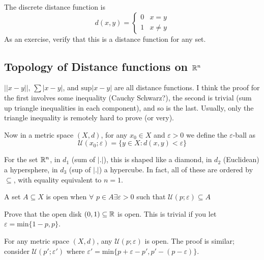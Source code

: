 \documentclass[12pt]{article}
\begin{document}
\begin{ex}
    The discrete distance function is
    \begin{equation}
        d(x,y) = \begin{cases} 0 & x = y \\ 1 & x \neq y \end{cases}
    \end{equation}
    As an exercise, verify that this is a distance function for any set.
\end{ex}

\subsection{Topology of Distance functions on $\mathbb{R}^n$}

\begin{ex}
    $||x-y||$, $\sum |x - y|$, and $\text{sup} |x - y|$ are all distance functions. I think the proof for the first involves some inequality (Cauchy Schwarz?), the second is trivial (sum up triangle inequalities in each component), and so is the last. Usually, only the triangle inequality is remotely hard to prove (or very).
\end{ex}

\begin{defn}
    Now in a metric space $(X,d)$, for any $x_0 \in X$ and $\varepsilon > 0$ we define the $\varepsilon$-ball as
    \begin{equation}
        \mathcal U(x_0;\varepsilon) = \{y \in X: d(x,y) < \varepsilon\}
    \end{equation}
\end{defn}

For the set $\mathbb{R}^n$, in $d_1$ (sum of $|.|$), this is shaped like a diamond, in $d_2$ (Euclidean) a hypersphere, in $d_3$ (sup of $|.|$) a hypercube. In fact, all of these are ordered by $\subseteq$, with equality equivalent to $n=1$.

\begin{defn}[Open]
    A set $A \subseteq X$ is open when $\forall$ $p \in A \exists \varepsilon > 0$ such that $\mathcal U(p;\varepsilon) \subseteq A$
\end{defn}

\begin{ex}
    Prove that the open disk $(0,1) \subseteq \mathbb{R}$ is open. This is trivial if you let $\varepsilon = \text{min}\{1-p,p\}$.
\end{ex}

\begin{rem}
    For any metric space $(X,d)$, any $\mathcal U(p;\varepsilon)$ is open. The proof is similar; consider $\mathcal U(p';\varepsilon')$ where $\varepsilon' = \text{min}\{p + \varepsilon - p', p' - (p - \varepsilon)\}$.
\end{rem}
\end{document}
